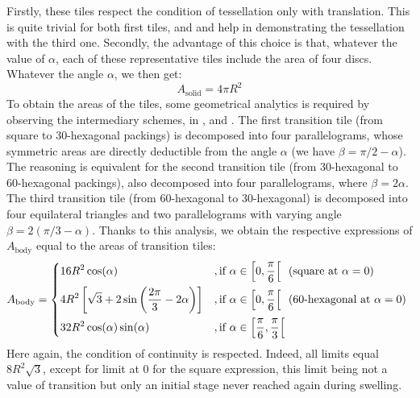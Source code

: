 \documentclass[11pt]{article}
\newcommand{\quadinou}{\,\,}
\newcommand{\piov}[1]{\pi/#1}
\newcommand{\piovf}[1]{\frac{\pi}{#1}}
\newcommand{\Abody}{A_{\text{body}}}
\newcommand{\Asolid}{A_{\text{solid}}}
\newenvironment{alignedatbracket}[1][2]{
	\left\{
	\begin{alignedat}{#1}
	}{
	\end{alignedat}
	\right.\
}
\begin{document}
Firstly, these tiles respect the condition of tessellation only with
translation. This is quite trivial for both first tiles, and 
and \tmphyperreftwo{g} help in demonstrating the tessellation with the third
one. Secondly, the advantage of this choice is that, whatever the value of
$\alpha$, each of these representative tiles include the area of four discs.
Whatever the angle $\alpha$, we then get:
\begin{equation}
	\Asolid = 4\pi R^2
\end{equation}
To obtain the areas of the tiles, some geometrical analytics is required by
observing the intermediary schemes, in \tmphyperrefone{a}, 
and \tmphyperreftwo{f}. The first transition tile (from square to 30-hexagonal
packings) is decomposed into four parallelograms, whose symmetric areas are
directly deductible from the angle $\alpha$ (we have $\beta = \piov{2} -
\alpha$). The reasoning is equivalent for the second transition tile (from
30-hexagonal to 60-hexagonal packings), also decomposed into four
parallelograms, where $\beta = 2\alpha$. The third transition tile (from
60-hexagonal to 30-hexagonal) is decomposed into four equilateral triangles and
two parallelograms with varying angle $\beta = 2(\piov{3} - \alpha)$. Thanks to
this analysis, we obtain the respective expressions of $\Abody$ equal to the
areas of transition tiles:
\begin{equation}
	\Abody = 
	\begin{alignedatbracket}[3]
		&16 R^2 \cos(\alpha)
		\quad &&, \text{if}\quadinou \alpha \in
		\left[0, \piovf{6}\right[
		\quadinou &&\text{(square at }\alpha = 0\text{)} \\
		&4 R^2 \left[
		\sqrt{3} + 2\sin\left(\frac{2\pi}{3} - 2\alpha\right)
		\right]
		\quad &&, \text{if}\quadinou \alpha \in
		\left[0, \piovf{6}\right[
		\quadinou &&\text{(60-hexagonal at }\alpha = 0\text{)} \\
		&32 R^2 \cos(\alpha) \sin(\alpha)
		\quad &&, \text{if}\quadinou \alpha \in
		\left[\piovf{6}, \piovf{3}\right[
		\quadinou &&\\
	\end{alignedatbracket}
	\label{equ:Abody}
\end{equation}
Here again, the condition of continuity is respected. Indeed, all limits equal
$8R^2\sqrt{3}$, except for limit at $0$ for the square expression, this limit
being not a value of transition but only an initial stage never reached again
during swelling.
\end{document}
